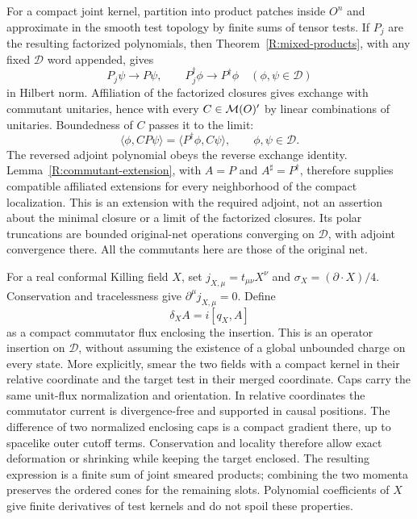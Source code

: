 For a compact joint kernel, partition into product patches inside $O^n$
and approximate in the smooth test topology by finite sums of tensor
tests.  If $P_j$ are the resulting factorized polynomials, then
Theorem~\ref{R:mixed-products}, with any fixed $\mathcal D$ word
appended, gives
\[
 P_j\psi\longrightarrow P\psi,\qquad
 P_j^\dagger\phi\longrightarrow P^\dagger\phi
 \quad(\phi,\psi\in\mathcal D)
\]
in Hilbert norm.  Affiliation of the factorized closures gives exchange
with commutant unitaries, hence with every $C\in\mathcal M(O)'$ by linear
combinations of unitaries.  Boundedness of $C$ passes it to the limit:
\[
 \langle\phi,CP\psi\rangle
       =\langle P^\dagger\phi,C\psi\rangle,
       \qquad \phi,\psi\in\mathcal D.
\]
The reversed adjoint polynomial obeys the reverse exchange identity.
Lemma~\ref{R:commutant-extension}, with $A=P$ and
$A^\sharp=P^\dagger$, therefore supplies compatible affiliated
extensions for every neighborhood of the compact localization.
This is an extension with the required adjoint, not an assertion
about the minimal closure or a limit of the factorized closures.
Its polar truncations are bounded original-net operations converging on
$\mathcal D$, with adjoint convergence there.  All the commutants here
are those of the original net.

For a real conformal Killing field $X$, set
$j_{X,\mu}=t_{\mu\nu}X^\nu$ and
$\sigma_X=(\partial\cdot X)/4$.  Conservation and tracelessness give
$\partial^\mu j_{X,\mu}=0$.  Define
\begin{equation}\label{R:Ward-definition}
 \delta_X A=i[q_X,A]
\end{equation}
as a compact commutator flux enclosing the insertion.  This is an
operator insertion on $\mathcal D$, without assuming the existence
of a global unbounded charge on every state.  More explicitly, smear
the two fields with a compact kernel in their relative coordinate
and the target test in their merged coordinate.  Caps carry the same
unit-flux normalization and orientation.  In relative coordinates the
commutator current is divergence-free and supported in causal positions.
The difference of two normalized enclosing caps is a compact gradient
there, up to spacelike outer cutoff terms.  Conservation and locality
therefore allow exact deformation or shrinking while keeping the target
enclosed.  The resulting expression is a finite sum of joint smeared
products; combining the two momenta preserves the ordered cones for
the remaining slots.  Polynomial coefficients of $X$ give finite
derivatives of test kernels and do not spoil these properties.


